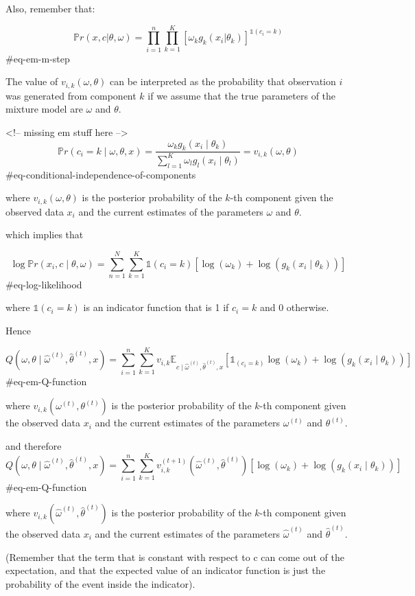 Also, remember that:

$$
\mathbb{P}r(x, c | \theta, \omega) =
\prod_{i=1}^n
\prod_{k=1}^K
[\omega_k g_k(x_i | \theta_k)]^{\mathbb{1}(c_i=k)}
$$ {#eq-em-m-step}

The value of $v_{i,k}(\omega, \theta)$ can be interpreted as the probability that observation $i$ was generated from component $k$ if we assume that the true parameters of
the mixture model are $\omega$ and $\theta$.


<!-- missing em stuff here -->
$$
\mathbb{P}r(c_i = k \mid \omega, \theta, x) = \frac{\omega_k g_k(x_i \mid \theta_k)}{\sum_{l=1}^K \omega_l g_l(x_i \mid \theta_l)} = v_{i,k}(\omega, \theta)
$$ {#eq-conditional-independence-of-components}

where $v_{i,k}(\omega, \theta)$ is the posterior probability of the $k$-th component given the observed data $x_i$ and the current estimates of the parameters $\omega$ and $\theta$.

which implies that 

$$
\log \mathbb{P}r(x_i,c \mid \theta, \omega) = \sum_{n=1}^N \sum_{k=1}^K \mathbb{1}(c_i=k) [\log(\omega_k) + \log(g_k(x_i \mid \theta_k))]
$$ {#eq-log-likelihood}

where $\mathbb{1}(c_i=k)$ is an indicator function that is 1 if $c_i = k$ and 0 otherwise.


Hence 

$$
Q(\omega, \theta \mid \hat{\omega}^{(t)}, \hat{\theta}^{(t)}, x) = \sum_{i=1}^n \sum_{k=1}^K v_{i,k} \mathbb{E}_{c \mid \hat{\omega}^{(t)}, \hat{\theta}^{(t)}, x} \left [\mathbb{1}_{(c_i=k)} \log(\omega_k) + \log(g_k(x_i \mid \theta_k))\right]
$$ {#eq-em-Q-function}

where $v_{i,k}(\omega^{(t)}, \theta^{(t)})$ is the posterior probability of the $k$-th component given the observed data $x_i$ and the current estimates of the parameters $\omega^{(t)}$ and $\theta^{(t)}$.

and therefore
$$
Q(\omega, \theta \mid \hat{\omega}^{(t)}, \hat{\theta}^{(t)}, x) = \sum_{i=1}^n \sum_{k=1}^K v_{i,k}^{(t+1)}\left(\hat{\omega}^{(t)}, \hat{\theta}^{(t)}\right) [\log(\omega_k) + \log(g_k(x_i \mid \theta_k))]
$$ {#eq-em-Q-function}

where $v_{i,k}(\hat{\omega}^{(t)}, \hat{\theta}^{(t)})$ is the posterior probability of the $k$-th component given the observed data $x_i$ and the current estimates of the parameters $\hat{\omega}^{(t)}$ and $\hat{\theta}^{(t)}$.

(Remember that the term that is constant with respect to c can come out of the expectation, and that the expected value of an indicator function is just the probability of the event inside the indicator). 

